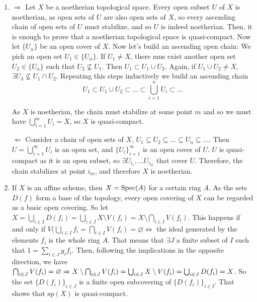 \begin{sol}
	\begin{enumerate}[label=\alph*)]
		\item $\boxed{\Rightarrow}$ Let $X$ be a noetherian topological space. Every open subset $U$ of $X$ is noetherian, as open sets of $U$ are also open sets of $X$, so every ascending chain of open sets of $U$ must stabilize, and so $U$ is indeed noetherian. Then, it is enough to prove that a noetherian topological space is quasi-compact. Now let $\{U_{\alpha}\}$ be an open cover of $X$. Now let's build an ascending open chain: We pick an open set $U_1 \in \{U_{\alpha}\}$. If $U_1 \neq X$, there mus exist another open set $U_2 \in \{U_{\alpha}\}$ such that $U_2 \not\subseteq U_1$. Then $U_1 \subset U_1 \cup U_2$. Again, if $U_1 \cup U_2 \neq X$, $\exists U_3 \not\subseteq U_1 \cap U_2$. Repeating this steps inductively we build an ascending chain
		\[
			U_1 \subset U_1 \cup U_2 \subset \dots \subset \bigcup_{i = 1}^n U_i \subset \dots
		\]

		As $X$ is noetherian, the chain must stabilize at some point $m$ and so we must have $\bigcup_{i = 1}^m U_i = X$, so $X$ is quasi-compact.

		$\boxed{\Leftarrow}$ Consider a chain of open sets of $X$, $U_1 \subseteq U_2 \subseteq \dots \subseteq U_n \subseteq \dots$. Then $U = \bigcup_{i = 1}^\infty U_i$ is an open set, and $\{U_i\}_{i = 1}^{\infty}$ is an open cover of $U$. $U$ is quasi-compact as it is an open subset, so $\exists U_{i_1}, \dots U_{i_m}$ that cover $U$. Therefore, the chain stabilizes at point $i_m$, and therefore $X$ is noetherian.

		\item If $X$ is an affine scheme, then $X = \mathrm{Spec}(A)$ for a certain ring $A$. As the sets $D(f)$ form a base of the topology, every open covering of $X$ can be regarded as a basic open covering. So let $X = \bigcup_{i \in I} D(f_i) = \bigcup_{i \in I} X \setminus V(f_i) = X \setminus \bigcap_{i \in I} V(f_i)$. This happens if and only if $V(\bigcup_{i \in I}f_i = \bigcap_{i \in I} V(f_i) = \varnothing \iff$ the ideal generated by the elements $f_i$ is the whole ring $A$. That means that $\exists J$ a finite subset of $I$ such that $1 = \sum_{i \in J}g_i f_i$. Then, following the implications in the opposite direction, we have $\bigcap_{i \in J} V(f_i) = \varnothing \Rightarrow X \setminus \bigcap_{i \in J}V(f_i) = \bigcup_{i \in J} X \setminus V(f_i) = \bigcup_{i \in J} D(f_i) = X$. So the set $\{D(f_i)\}_{i \in J}$ is a finite open subcovering of $\{D(f_i)\}_{i \in I}$. That shows that $\mathrm{sp}(X)$ is quasi-compact.


\end{enumerate}
\end{sol}
